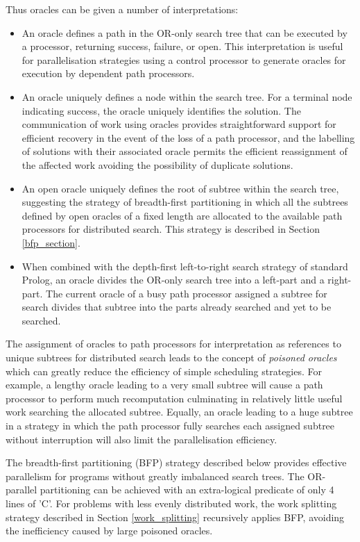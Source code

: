 \documentclass[a4paper,11pt,twoside]{article}
\begin{document}
Thus oracles can be given a number of interpretations:
\begin{itemize}
\item{An oracle defines a path in the OR-only search tree that can be executed
  by a processor, returning success, failure, or open.  This interpretation is
  useful for parallelisation strategies using a control processor to
  generate oracles for execution by dependent path processors.}
\item{An oracle uniquely defines a node within the search tree.  For a 
  terminal node indicating success, the oracle uniquely identifies the
  solution.  The communication of work using oracles provides straightforward
  support for efficient recovery in the event of the loss of a path processor, and
  the labelling of solutions with their associated oracle permits the
  efficient reassignment of the affected work avoiding the possibility of
  duplicate solutions.}
\item{An open oracle uniquely defines the root of subtree within the search tree,
  suggesting the strategy of breadth-first partitioning in which all the
  subtrees defined by open oracles of a fixed length are allocated to the
  available path processors for distributed search.  This strategy is
  described in Section \ref{bfp_section}.}
\item{When combined with the depth-first left-to-right search strategy of standard
  Prolog, an oracle divides the OR-only search tree into a left-part and a
  right-part.  The current oracle of a busy path processor assigned a subtree
  for search divides that subtree into the parts already searched and yet to be
  searched.}
\end{itemize}

The assignment of oracles to path processors for
interpretation as references to unique subtrees for distributed search leads
to the concept of \textit{poisoned oracles}
which can greatly reduce the efficiency of simple scheduling
strategies.  For example,
a lengthy oracle leading to a
very small subtree will cause a path processor to perform much recomputation
culminating in relatively little useful work searching the allocated subtree.
Equally,
an oracle leading to a huge subtree in a strategy in which the path processor
fully searches each assigned subtree without interruption will also limit
the parallelisation efficiency.

The breadth-first partitioning (BFP) strategy described below provides effective
parallelism for programs without greatly imbalanced search trees.  The OR-parallel
partitioning can be achieved with an extra-logical predicate of only 4 lines of 'C'.
For problems with less evenly distributed work, the work splitting strategy described in
Section \ref{work_splitting} recursively applies BFP,  avoiding the inefficiency caused
by large poisoned oracles.
\end{document}
